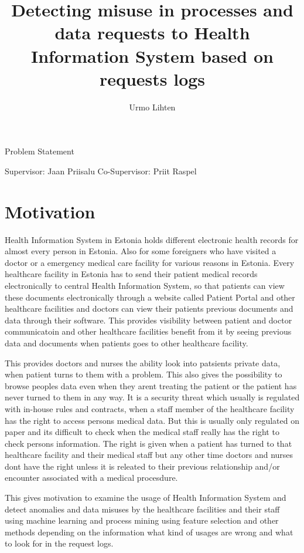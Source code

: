 \documentclass[12pt]{article}
\title{Detecting misuse in processes and data requests to Health Information System based on requests logs}
\author{Urmo Lihten}
\begin{document}

\maketitle

\begin{center}
	Problem Statement
\end{center}
\begin{flushright}
	Supervisor: Jaan Priisalu
	Co-Supervisor: Priit Raspel
\end{flushright}

\section{Motivation}

Health Information System in Estonia holds different electronic health records for almost every person in Estonia. Also for some foreigners who have visited a doctor or a emergency medical care facility for various reasons in Estonia. 
Every healthcare facility in Estonia has to send their patient medical records electronically to central Health Information System, so that patients can view these documents electronically through a website called Patient Portal and other healthcare facilities and doctors can view their patients previous documents and data through their software. This provides visibility between patient and doctor communicatoin and other healthcare facilities benefit from it by seeing previous data and documents when patients goes to other healthcare facility. 

This provides doctors and nurses the ability look into patsients private data, when patient turns to them with a problem. This also gives the possibility to browse peoples data even when they arent treating the patient or the patient has never turned to them in any way. It is a security threat which usually is regulated with in-house rules and contracts, when a staff member of the healthcare facility has the right to access persons medical data. But this is usually only regulated on paper and its difficult to check when the medical staff really has the right to check persons information. The right is given when a patient has turned to that healthcare facility and their medical staff but any other time doctors and nurses dont have the right unless it is releated to their previous relationship and/or encounter associated with a medical procesdure. 

This gives motivation to examine the usage of Health Information System and detect anomalies and data misuses by the healthcare facilities and their staff using machine learning and process mining using feature selection and other methods depending on the information what kind of usages are wrong and what to look for in the request logs.
\end{document}
